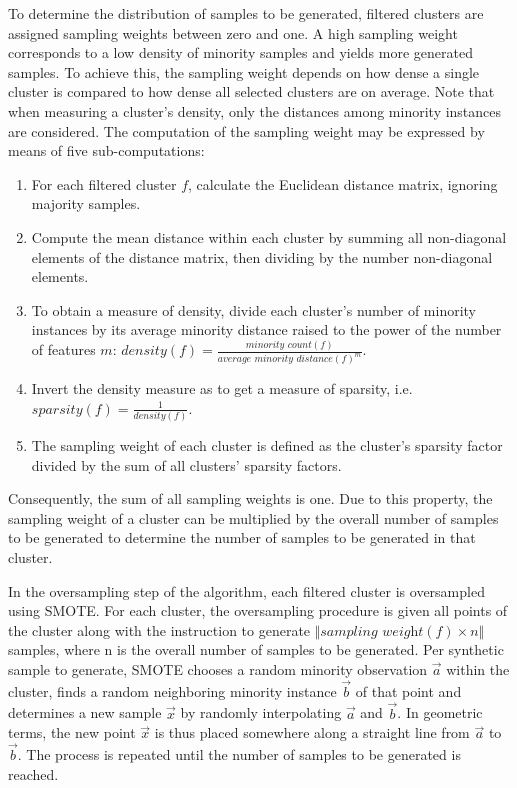 \documentclass[sort&compress]{elsarticle}
\begin{document}
	To determine the distribution of samples to be generated, filtered clusters are assigned sampling weights between zero and one. A high sampling weight corresponds to a low density of minority samples and yields more generated samples. To achieve this, the sampling weight depends on how dense a single cluster is compared to how dense all selected clusters are on average. Note that when measuring a cluster's density, only the distances among minority instances are considered. The computation of the sampling weight may be expressed by means of five sub-computations:
	\begin{enumerate}
		\item For each filtered cluster $f$, calculate the Euclidean distance matrix, ignoring majority samples.
		\item Compute the mean distance within each cluster by summing all non-diagonal elements of the distance matrix, then dividing by the number non-diagonal elements.
		\item To obtain a measure of density, divide each cluster's number of minority instances by its average minority distance raised to the power of the number of features $m$: $density(f) = \frac{\textit{minority count}(f)}{\textit{average minority distance}(f)^{m}}$.
		\item Invert the density measure as to get a measure of sparsity, i.e. $sparsity(f) = \frac{1}{density(f)}$.
		\item The sampling weight of each cluster is defined as the cluster's sparsity factor divided by the sum of all clusters' sparsity factors.
	\end{enumerate}
	 Consequently, the sum of all sampling weights is one. Due to this property, the sampling weight of a cluster can be multiplied by the overall number of samples to be generated to determine the number of samples to be generated in that cluster.

	In the oversampling step of the algorithm, each filtered cluster is oversampled using \ac{SMOTE}. For each cluster, the oversampling procedure is given all points of the cluster along with the instruction to generate $\Vert \textit{sampling weight}(f) \times n \Vert$ samples, where n is the overall number of samples to be generated. Per synthetic sample to generate, \ac{SMOTE} chooses a random minority observation $\vec{a}$ within the cluster, finds a random neighboring minority instance $\vec{b}$ of that point and determines a new sample $\vec{x}$ by randomly interpolating $\vec{a}$ and $\vec{b}$. In geometric terms, the new point $\vec{x}$ is thus placed somewhere along a straight line from $\vec{a}$ to $\vec{b}$. The process is repeated until the number of samples to be generated is reached. 
	
\end{document}
